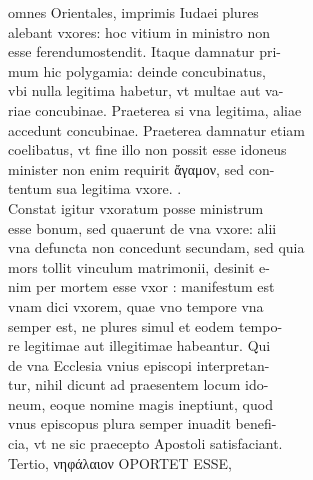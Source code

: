 \documentclass{article}
\begin{document}
\begin{pages}
                omnes Orientales, imprimis Iudaei plures \\
                alebant vxores: hoc vitium in ministro non \\
                esse ferendumostendit. Itaque damnatur pri- \\
                mum hic polygamia: deinde concubinatus, \\
                vbi nulla legitima habetur, vt multae aut va- \\
                riae concubinae. Praeterea si vna legitima, aliae \\
                accedunt concubinae. Praeterea damnatur etiam \\
                coelibatus, vt fine illo non possit esse idoneus \\
                minister non enim requirit ἄγαμον, sed con- \\
                tentum sua legitima vxore. . \\
                Constat igitur vxoratum posse ministrum \\
                esse bonum, sed quaerunt de vna vxore: alii \\
                vna defuncta non concedunt secundam, sed quia \\
                mors tollit vinculum matrimonii, desinit e- \\
                nim per mortem esse vxor : manifestum est \\
                vnam dici vxorem, quae vno tempore vna \\
                semper est, ne plures simul et eodem tempo- \\
                re legitimae aut illegitimae habeantur. Qui \\
                de vna Ecclesia vnius episcopi interpretan- \\
                tur, nihil dicunt ad praesentem locum ido- \\
                neum, eoque nomine magis ineptiunt, quod \\
                vnus episcopus plura semper inuadit benefi- \\
                cia, vt ne sic praecepto Apostoli satisfaciant. \\
                Tertio, νηφάλαιον OPORTET ESSE, \\

\end{pages}
\end{document}
